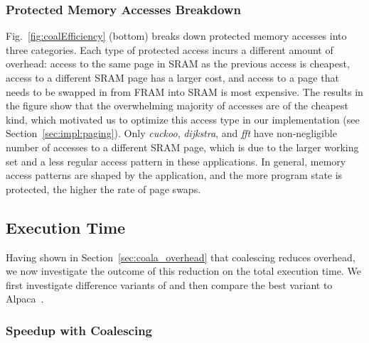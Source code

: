 \subsubsection{Protected Memory Accesses Breakdown}
%
Fig.~\ref{fig:coalEfficiency} (bottom) breaks down protected memory accesses
into three categories.
%
Each type of protected access incurs a different amount of overhead: access to
the same page in SRAM as the previous access is cheapest, access to a different
SRAM page has a larger cost, and access to a page that needs to be swapped in
from FRAM into SRAM is most expensive.
%
The results in the figure show that the overwhelming majority of accesses are
of the cheapest kind, which motivated us to optimize this access type in our
implementation (see Section~\ref{sec:impl:paging}).
%
Only \textit{cuckoo}, \textit{dijkstra}, and \textit{fft} have non-negligible
number of accesses to a different SRAM page, which is due to the larger working
set and a less regular access pattern in these applications.
%
In general, memory access patterns are shaped by the application, and the more
program state is protected, the higher the rate of page swaps.
%
\subsection{Execution Time}
\label{sec:result_coalescing}
%
Having shown in Section~\ref{sec:coala_overhead} that coalescing reduces
overhead, we now investigate the outcome of this reduction on the total
execution time. We first investigate difference variants of \sys and
then compare the best variant to Alpaca~\cite{alpaca}.
%
\subsubsection{\sys Speedup with Coalescing}

